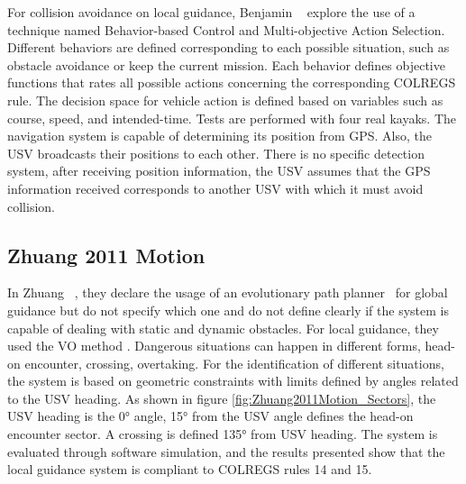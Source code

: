     
    For collision avoidance on local guidance, Benjamin \etal~\cite{Benjamin2004COLREGS} explore the use of a technique named Behavior-based Control and Multi-objective Action Selection. Different behaviors are defined corresponding to each possible situation, such as obstacle avoidance or keep the current mission. Each behavior defines objective functions that rates all possible actions concerning the corresponding \ac{COLREGS} rule. The decision space for vehicle action is defined based on variables such as course, speed, and intended-time. Tests are performed with four real kayaks. The navigation system is capable of determining its position from \ac{GPS}. Also, the \ac{USV} broadcasts their positions to each other. There is no specific detection system, after receiving position information, the \ac{USV} assumes that the \ac{GPS} information received corresponds to another \ac{USV} with which it must avoid collision.
    
    \subsection{Zhuang 2011 Motion}
    In Zhuang \etal~\cite{Zhuang2011Motion}, they declare the usage of an evolutionary path planner~\cite{Russel2003AI_GA} for global guidance but do not specify which one and do not define clearly if the system is capable of dealing with static and dynamic obstacles. For local guidance, they used the \ac{VO} method \cite{Fiorini1998Motion}. Dangerous situations can happen in different forms, head-on encounter, crossing, overtaking. For the identification of different situations, the system is based on geometric constraints with limits defined by angles related to the \ac{USV} heading. As shown in figure \ref{fig:Zhuang2011Motion_Sectors}, the \ac{USV} heading is the 0° angle, 15° from the \ac{USV} angle defines the head-on encounter sector. A crossing is defined 135° from \ac{USV} heading. The system is evaluated through software simulation, and the results presented show that the local guidance system is compliant to \ac{COLREGS} rules 14 and 15.
    
